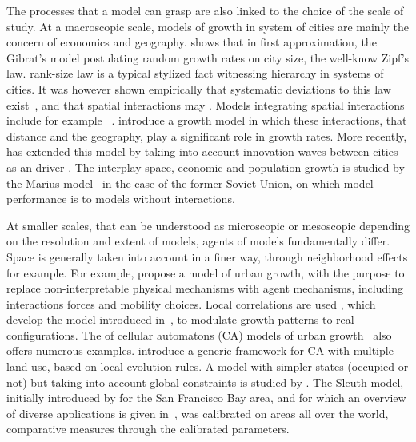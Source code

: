 \documentclass[10pt,letterpaper]{article}
\begin{document}
The processes that a model can grasp are also linked to the choice of the scale of study. At a macroscopic scale, models of growth in system of cities are mainly the concern of economics and geography. \cite{gabaix1999zipf} shows that in first approximation, the Gibrat's model postulating random growth rates  on city size,  the well-know Zipf's law.  rank-size law  is a typical stylized fact witnessing hierarchy in systems of cities. It was however shown empirically that systematic deviations to this law exist~\cite{rozenfeld2008laws}, and that spatial interactions may . Models integrating spatial interactions include for example ~\cite{bretagnolle2000long}.  introduce a growth model in which these interactions, that  distance and the geography, play a significant role in growth rates. More recently, \cite{favaro2011gibrat} has extended this model by taking into account innovation waves between cities as an  driver . The interplay  space, economic and population growth is studied by the Marius model~\cite{cottineau2014evolution} in the case of the former Soviet Union, on which model performance is  to models without interactions.


At smaller scales, that can be understood as microscopic or mesoscopic depending on the resolution and extent of models, agents of models fundamentally differ. Space is generally taken into account in a finer way, through neighborhood effects for example. For example, \cite{andersson2002urban} propose a  model of urban growth, with the purpose to replace non-interpretable physical mechanisms with agent mechanisms, including interactions forces and mobility choices. Local correlations are used  \cite{makse1998modeling}, which develop the model introduced in~\cite{makse1995modelling},  to modulate growth patterns to  real configurations. The  of cellular automatons (CA) models of urban growth~\cite{batty1994cells} also offers numerous examples. \cite{GEAN:GEAN940} introduce a generic framework for CA with multiple  land use, based on local evolution rules. A model with simpler states (occupied or not) but taking into account global constraints is studied by \cite{ward2000stochastically}. The Sleuth model, initially introduced by \cite{clarke1998loose} for the San Francisco Bay area, and for which an overview of diverse applications is given in~\cite{clarke2007decade}, was calibrated on  areas all over the world,  comparative measures through the calibrated parameters.
\end{document}

